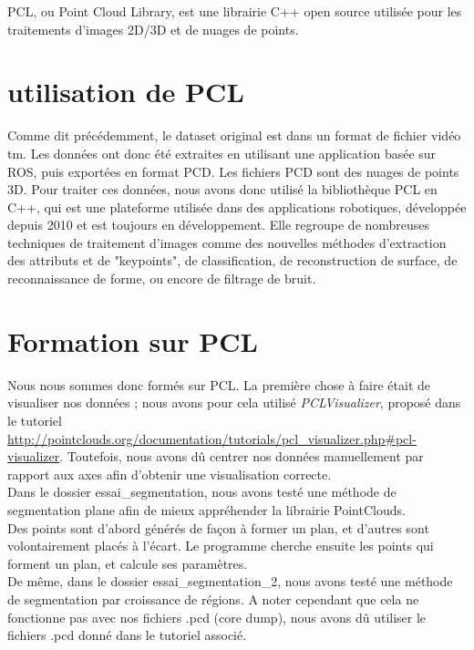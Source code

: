 PCL, ou Point Cloud Library, est une librairie C++ open source utilisée pour les traitements d'images 2D/3D et de nuages de points.\\

\section{utilisation de PCL}

	Comme dit précédemment, le dataset original est dans un format de fichier vidéo tm. Les données ont donc été extraites en utilisant une application basée sur ROS, puis exportées en format PCD. Les fichiers PCD sont des nuages de points 3D. Pour traiter ces données, nous avons donc utilisé la bibliothèque PCL en C++, qui est une plateforme utilisée dans des applications robotiques, développée depuis 2010 et est toujours en développement. Elle regroupe de nombreuses techniques de traitement d'images comme des nouvelles méthodes d'extraction des attributs et de "keypoints", de classification, de reconstruction de surface, de reconnaissance de forme, ou encore de filtrage de bruit.

\section{Formation sur PCL}

	Nous nous sommes donc formés sur PCL. La première chose à faire était de visualiser nos données ; nous avons pour cela utilisé \emph{PCLVisualizer}, proposé dans le tutoriel \url{http://pointclouds.org/documentation/tutorials/pcl_visualizer.php#pcl-visualizer}. Toutefois, nous avons dû centrer nos données manuellement par rapport aux axes afin d'obtenir une visualisation correcte.\\

	Dans le dossier essai\_segmentation, nous avons testé une méthode de segmentation plane afin de mieux appréhender la librairie PointClouds.\\
	Des points sont d'abord générés de façon à former un plan, et d'autres sont volontairement placés à l'écart. Le programme cherche ensuite les points qui forment un plan, et calcule ses paramètres.\\

	De même, dans le dossier essai\_segmentation\_2, nous avons testé une méthode de segmentation par croissance de régions. A noter cependant que cela ne fonctionne pas avec nos fichiers .pcd (core dump), nous avons dû utiliser le fichiers .pcd donné dans le tutoriel associé.\\

